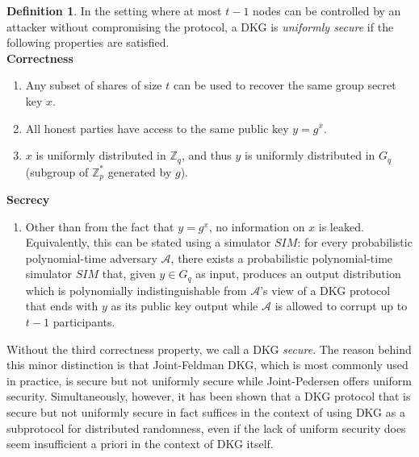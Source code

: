 \documentclass[letterpaper,twocolumn,10pt]{article}
\theoremstyle{definition}
\newtheorem{definition}[theorem]{Definition}
\theoremstyle{remark}
\begin{document}
\begin{definition}
In the setting where at most $t - 1$ nodes can be controlled by an attacker without compromising the protocol, a DKG is \textit{uniformly secure} if the following properties are satisfied.\\

\textbf{Correctness}
\begin{enumerate}
\item Any subset of shares of size $t$ can be used to recover the same group secret key $x$.
\item All honest parties have access to the same public key $y = g^x$.
\item $x$ is uniformly distributed in $\mathbb{Z}_q$, and thus $y$ is uniformly distributed in $G_q$ (subgroup of $\mathbb{Z}^*_p$ generated by $g$).
\end{enumerate}

\textbf{Secrecy}
\begin{enumerate}
\item Other than from the fact that $y = g^x$, no information on $x$ is leaked. Equivalently, this can be stated using a simulator $SIM$: for every probabilistic polynomial-time adversary $\mathcal{A}$, there exists a probabilistic polynomial-time simulator $SIM$ that, given $y \in G_q$ as input, produces an output distribution which is polynomially indistinguishable from $\mathcal{A}$'s view of a DKG protocol that ends with $y$ as its public key output while $\mathcal{A}$ is allowed to corrupt up to $t - 1$ participants.
\end{enumerate}
\end{definition}

Without the third correctness property, we call a DKG \textit{secure}. The reason behind this minor distinction is that Joint-Feldman DKG, which is most commonly used in practice, is secure but not uniformly secure while Joint-Pedersen offers uniform security. Simultaneously, however, it has been shown that a DKG protocol that is secure but not uniformly secure in fact suffices in the context of using DKG as a subprotocol for distributed randomness, even if the lack of uniform security does seem insufficient a priori in the context of DKG itself.

\end{document}
